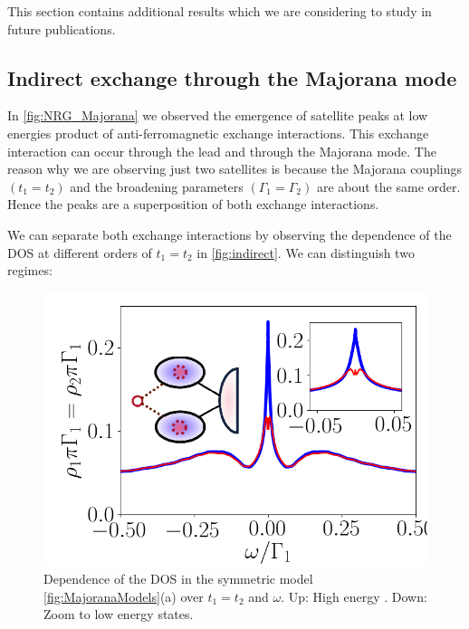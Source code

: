 This section contains additional results which we are considering to study in  future publications. 

\subsection{Indirect exchange through the Majorana mode}

In \ref{fig:NRG_Majorana} we observed the emergence of satellite peaks at low energies product of anti-ferromagnetic exchange interactions. This exchange interaction can occur through the lead and through the Majorana mode. The reason why we are observing just two satellites is because the Majorana  couplings $(t_1=t_2)$ and the broadening parameters $(\Gamma_1 = \Gamma_2)$ are about the same order. Hence the peaks are a superposition of both exchange interactions. 

We can separate both exchange interactions by observing the dependence of the DOS at different orders of $t_1=t_2$ in \ref{fig:indirect}. We can distinguish two regimes:

\begin{figure}[t]
\centering
\includegraphics[scale=0.5]{IMAGES/NRG/Lowt1=t2.png}
\caption{ \label{fig:indirectLow} Dependence of the DOS in the symmetric model \ref{fig:MajoranaModels}(a) over $t_1=t_2$ and $\omega$. Up: High energy . Down: Zoom to low energy states.  \protect\Source{}}
\end{figure}

